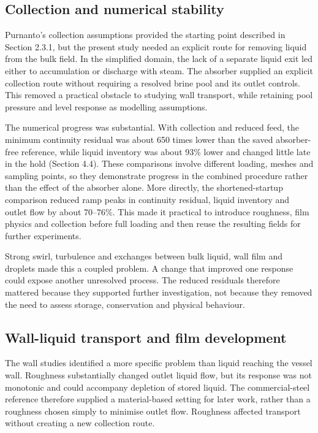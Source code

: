 \documentclass[12pt]{article}
\begin{document}
\subsection{Collection and numerical stability}\label{collection-and-numerical-stability}

Purnanto's collection assumptions provided the starting point described in Section 2.3.1, but the present study needed an explicit route for removing liquid from the bulk field. In the simplified domain, the lack of a separate liquid exit led either to accumulation or discharge with steam. The absorber supplied an explicit collection route without requiring a resolved brine pool and its outlet controls. This removed a practical obstacle to studying wall transport, while retaining pool pressure and level response as modelling assumptions.

The numerical progress was substantial. With collection and reduced feed, the minimum continuity residual was about 650 times lower than the saved absorber-free reference, while liquid inventory was about 93\% lower and changed little late in the hold (Section 4.4). These comparisons involve different loading, meshes and sampling points, so they demonstrate progress in the combined procedure rather than the effect of the absorber alone. More directly, the shortened-startup comparison reduced ramp peaks in continuity residual, liquid inventory and outlet flow by about 70--76\%. This made it practical to introduce roughness, film physics and collection before full loading and then reuse the resulting fields for further experiments.

Strong swirl, turbulence and exchanges between bulk liquid, wall film and droplets made this a coupled problem. A change that improved one response could expose another unresolved process. The reduced residuals therefore mattered because they supported further investigation, not because they removed the need to assess storage, conservation and physical behaviour.

\subsection{Wall-liquid transport and film development}\label{wall-liquid-transport-and-film-development}

The wall studies identified a more specific problem than liquid reaching the vessel wall. Roughness substantially changed outlet liquid flow, but its response was not monotonic and could accompany depletion of stored liquid. The commercial-steel reference therefore supplied a material-based setting for later work, rather than a roughness chosen simply to minimise outlet flow. Roughness affected transport without creating a new collection route.
\end{document}
